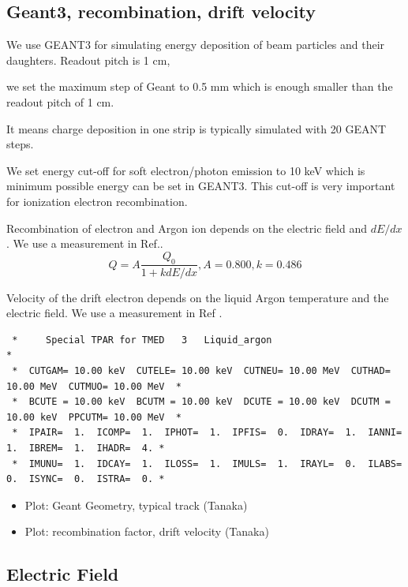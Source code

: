 \documentclass{cernyrep}
\begin{document}
\subsection{Geant3, recombination, drift velocity}

We use GEANT3 for simulating energy deposition of beam particles and
their daughters. Readout pitch is 1 cm, 

we set the maximum step of Geant to 0.5 mm
which is enough smaller than the readout pitch of 1 cm.

It means charge deposition in one strip is typically 
simulated with 20 GEANT steps.

We set energy cut-off for soft electron/photon emission to
10 keV which is minimum possible energy can be set in GEANT3.
This cut-off is very important for  ionization electron recombination.

Recombination of electron and Argon ion depends on
the electric field and $dE/dx$. We use a measurement in Ref.\cite{658352}.
\begin{equation}
Q = A \frac{Q_0}{1 + k dE/dx}, A = 0.800, k = 0.486
\end{equation}

Velocity of the drift electron depends on the liquid Argon temperature
and the electric field. We use a measurement in Ref \cite{649233}.


\begin{verbatim}
 *     Special TPAR for TMED   3   Liquid_argon                                                    *
 *  CUTGAM= 10.00 keV  CUTELE= 10.00 keV  CUTNEU= 10.00 MeV  CUTHAD= 10.00 MeV  CUTMUO= 10.00 MeV  *
 *  BCUTE = 10.00 keV  BCUTM = 10.00 keV  DCUTE = 10.00 keV  DCUTM = 10.00 keV  PPCUTM= 10.00 MeV  *
 *  IPAIR=  1.  ICOMP=  1.  IPHOT=  1.  IPFIS=  0.  IDRAY=  1.  IANNI=  1.  IBREM=  1.  IHADR=  4. *
 *  IMUNU=  1.  IDCAY=  1.  ILOSS=  1.  IMULS=  1.  IRAYL=  0.  ILABS=  0.  ISYNC=  0.  ISTRA=  0. *
\end{verbatim}



\begin{itemize}
\item Plot: Geant Geometry, typical track (Tanaka)
\item Plot: recombination factor, drift velocity  (Tanaka)
\end{itemize}

\subsection{Electric Field}
\end{document}
